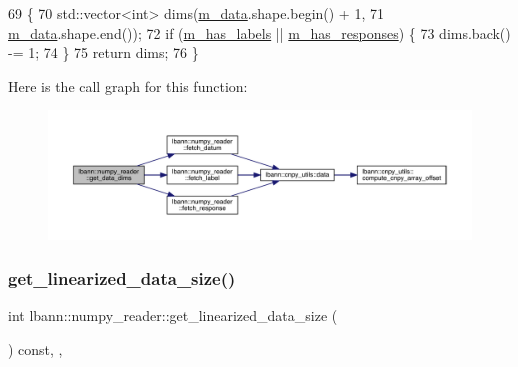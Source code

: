 \begin{DoxyCode}
69                                                       \{
70     std::vector<int> dims(\hyperlink{classlbann_1_1numpy__reader_a6d43a1eae0fedb6fa237b24cef8f37fa}{m\_data}.shape.begin() + 1,
71                           \hyperlink{classlbann_1_1numpy__reader_a6d43a1eae0fedb6fa237b24cef8f37fa}{m\_data}.shape.end());
72     \textcolor{keywordflow}{if} (\hyperlink{classlbann_1_1numpy__reader_a0e8caa5609e706bf909b78c4c35377b8}{m\_has\_labels} || \hyperlink{classlbann_1_1numpy__reader_a7567338be86dff81afece19d031a942d}{m\_has\_responses}) \{
73       dims.back() -= 1;
74     \}
75     \textcolor{keywordflow}{return} dims;
76   \}
\end{DoxyCode}
Here is the call graph for this function\+:\nopagebreak
\begin{figure}[H]
\begin{center}
\leavevmode
\includegraphics[width=350pt]{classlbann_1_1numpy__reader_aad4adc242e92334d016127cedc66fc70_cgraph}
\end{center}
\end{figure}
\mbox{\label{classlbann_1_1numpy__reader_a527f5dd6da76da189b3c4c72a4b129b3}} 
\subsubsection{\texorpdfstring{get\+\_\+linearized\+\_\+data\+\_\+size()}{get\_linearized\_data\_size()}}
{\footnotesize\ttfamily int lbann\+::numpy\+\_\+reader\+::get\+\_\+linearized\+\_\+data\+\_\+size (\begin{DoxyParamCaption}{ }\end{DoxyParamCaption}) const\hspace{0.3cm}{\ttfamily [inline]}, {\ttfamily [override]}, {\ttfamily [virtual]}}



